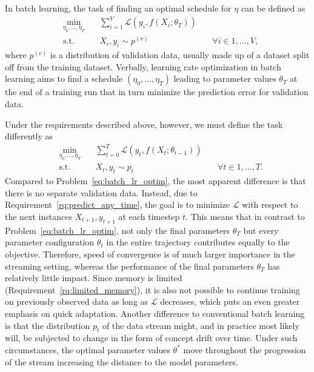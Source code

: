 \documentclass[letterpaper]{article} %
\begin{document}
In batch learning, the task of finding an optimal schedule for $\eta$ can be defined as
\begin{equation}
	\label{eq:batch_lr_optim}
	\begin{alignedat}{3}
		& \!\min_{\eta_0, \ldots, \eta_T} & \, & \sum_{i=1}^{V}\mathcal{L}(y_i, f(X_i; \theta_T)) &    &                              \\
		& \text{s.t.}                     &    & X_i, y_i  \sim p^{(v)}                           & \  & \forall i \in {1, \ldots, V}
		,
	\end{alignedat}
\end{equation}
where $p^{(v)}$ is a distribution of validation data, usually made up of a dataset split off from the training dataset.
Verbally, learning rate optimization in batch learning aims to find a schedule $(\eta_0, \ldots, \eta_T)$ leading to parameter values $\theta_T$ at the end of a training run that in turn minimize the prediction error for validation data.

Under the requirements described above, however, we must define the task differently as
\begin{equation}
	\label{eq:stream_lr_optim}
	\begin{alignedat}{3}
		& \!\min_{\eta_0, \ldots, \eta_T} & \, & \sum_{t=0}^{T}\mathcal{L}(y_t, f(X_t; \theta_{t-1})) &    &                               \\
		& \text{s.t.}                     &    & X_t, y_t  \sim p_t                           & \  & \forall t \in {1, \ldots, T}.
	\end{alignedat}
\end{equation}
Compared to Problem~\eqref{eq:batch_lr_optim}, the most apparent difference is that there is no separate validation data.
Instead, due to Requirement~\ref{rq:predict_any_time}, the goal is to minimize $\mathcal{L}$ with respect to the next instances $X_{t+1}, y_{t+1}$ at each timestep $t$.
This means that in contrast to Problem~\eqref{eq:batch_lr_optim}, not only the final parameters $\theta_T$ but every parameter configuration $\theta_t$ in the entire trajectory contributes equally to the objective.
Therefore, speed of convergence is of much larger importance in the streaming setting, whereas the performance of the final parameters $\theta_T$ has relatively little impact.
Since memory is limited (Requirement~\ref{rq:limited_memory}), it is also not possible to continue training on previously observed data as long as $\mathcal{L}$ decreases, which puts an even greater emphasis on quick adaptation.
Another difference to conventional batch learning is that the distribution $p_t$ of the data stream might, and in practice most likely will, be subjected to change in the form of concept drift over time.
Under such circumstances, the optimal parameter values $\theta^*$ move throughout the progression of the stream increasing the distance to the model parameters.
\end{document}
